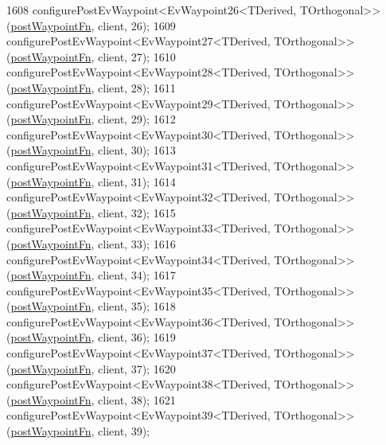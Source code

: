 \begin{DoxyCode}
1608     configurePostEvWaypoint<EvWaypoint26<TDerived, TOrthogonal>>(\hyperlink{classcl__move__base__z_1_1WaypointEventDispatcher_a964a57fcce5d48ec60243230722d8dd7}{postWaypointFn}, client, 26);
1609     configurePostEvWaypoint<EvWaypoint27<TDerived, TOrthogonal>>(\hyperlink{classcl__move__base__z_1_1WaypointEventDispatcher_a964a57fcce5d48ec60243230722d8dd7}{postWaypointFn}, client, 27);
1610     configurePostEvWaypoint<EvWaypoint28<TDerived, TOrthogonal>>(\hyperlink{classcl__move__base__z_1_1WaypointEventDispatcher_a964a57fcce5d48ec60243230722d8dd7}{postWaypointFn}, client, 28);
1611     configurePostEvWaypoint<EvWaypoint29<TDerived, TOrthogonal>>(\hyperlink{classcl__move__base__z_1_1WaypointEventDispatcher_a964a57fcce5d48ec60243230722d8dd7}{postWaypointFn}, client, 29);
1612     configurePostEvWaypoint<EvWaypoint30<TDerived, TOrthogonal>>(\hyperlink{classcl__move__base__z_1_1WaypointEventDispatcher_a964a57fcce5d48ec60243230722d8dd7}{postWaypointFn}, client, 30);
1613     configurePostEvWaypoint<EvWaypoint31<TDerived, TOrthogonal>>(\hyperlink{classcl__move__base__z_1_1WaypointEventDispatcher_a964a57fcce5d48ec60243230722d8dd7}{postWaypointFn}, client, 31);
1614     configurePostEvWaypoint<EvWaypoint32<TDerived, TOrthogonal>>(\hyperlink{classcl__move__base__z_1_1WaypointEventDispatcher_a964a57fcce5d48ec60243230722d8dd7}{postWaypointFn}, client, 32);
1615     configurePostEvWaypoint<EvWaypoint33<TDerived, TOrthogonal>>(\hyperlink{classcl__move__base__z_1_1WaypointEventDispatcher_a964a57fcce5d48ec60243230722d8dd7}{postWaypointFn}, client, 33);
1616     configurePostEvWaypoint<EvWaypoint34<TDerived, TOrthogonal>>(\hyperlink{classcl__move__base__z_1_1WaypointEventDispatcher_a964a57fcce5d48ec60243230722d8dd7}{postWaypointFn}, client, 34);
1617     configurePostEvWaypoint<EvWaypoint35<TDerived, TOrthogonal>>(\hyperlink{classcl__move__base__z_1_1WaypointEventDispatcher_a964a57fcce5d48ec60243230722d8dd7}{postWaypointFn}, client, 35);
1618     configurePostEvWaypoint<EvWaypoint36<TDerived, TOrthogonal>>(\hyperlink{classcl__move__base__z_1_1WaypointEventDispatcher_a964a57fcce5d48ec60243230722d8dd7}{postWaypointFn}, client, 36);
1619     configurePostEvWaypoint<EvWaypoint37<TDerived, TOrthogonal>>(\hyperlink{classcl__move__base__z_1_1WaypointEventDispatcher_a964a57fcce5d48ec60243230722d8dd7}{postWaypointFn}, client, 37);
1620     configurePostEvWaypoint<EvWaypoint38<TDerived, TOrthogonal>>(\hyperlink{classcl__move__base__z_1_1WaypointEventDispatcher_a964a57fcce5d48ec60243230722d8dd7}{postWaypointFn}, client, 38);
1621     configurePostEvWaypoint<EvWaypoint39<TDerived, TOrthogonal>>(\hyperlink{classcl__move__base__z_1_1WaypointEventDispatcher_a964a57fcce5d48ec60243230722d8dd7}{postWaypointFn}, client, 39);

\end{DoxyCode}
